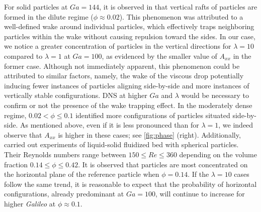 For solid particles at $Ga = 144$, it is observed in \citet{shajahan2023inertial} that vertical rafts of particles are formed in the dilute regime ($\phi \approx 0.02$). This phenomenon was attributed to a well-defined wake around individual particles, which effectively traps neighboring particles within the wake without causing repulsion toward the sides. %
In our case, we notice a greater concentration of particles in the vertical directions for $\lambda = 10$ compared to $\lambda = 1$ at $Ga = 100$, as evidenced by the smaller value of $A_{xx}$ in the former case. Although not immediately apparent, this phenomenon could be attributed to similar factors, namely, the wake of the viscous drop potentially inducing fewer instances of particles aligning side-by-side and more instances of vertically stable configurations. DNS at higher $Ga$ and $\lambda$ would be necessary to confirm or not the presence of the wake trapping effect. %
In the moderately dense regime,  $0.02 < \phi \le 0.1$  \citet{shajahan2023inertial} identified more configurations of particles situated side-by-side. 
As mentioned above, even if it is less pronounced than for $\lambda = 1$, we indeed observe that $A_{xx}$ is higher in these cases; see \ref{fig:phase} (right). 
Additionally, \citet{almeras2021statistics} carried out experiments of liquid-solid fluidized bed with spherical particles. 
Their Reynolds numbers range between $150\leq Re \leq 360$ depending on the volume fraction $0.14 \leq \phi \leq 0.42$.
It is observed that particles are most concentrated on the horizontal plane of the reference particle when $\phi = 0.14$.
If the $\lambda = 10$ cases follow the same trend, it is reasonable to expect that the probability of horizontal configurations, already predominant at $Ga =100$, will continue to increase for higher \textit{Galileo} at $\phi  \approx 0.1$.

